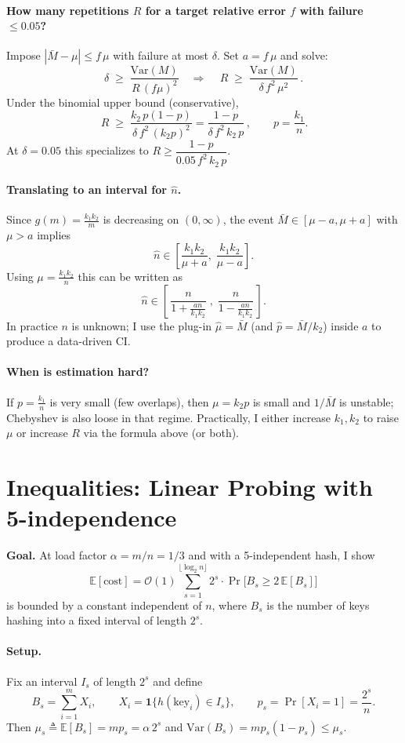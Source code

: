\paragraph{How many repetitions $R$ for a target relative error $f$ with failure $\le 0.05$?}
Impose $|\bar M-\mu|\le f\,\mu$ with failure at most $\delta$. Set $a=f\,\mu$ and solve:
\[
\delta\;\ge\; \frac{\mathrm{Var}(M)}{R\,(f\mu)^2}
\quad\Longrightarrow\quad
\boxed{\,R\;\ge\;\frac{\mathrm{Var}(M)}{\delta\,f^2\,\mu^2}\,}.
\]
Under the binomial upper bound (conservative),
\[
\boxed{\,R\;\ge\;\frac{k_2\,p(1-p)}{\delta\,f^2\,(k_2p)^2}
=\frac{1-p}{\delta\,f^2\,k_2\,p}\,,
\qquad p=\frac{k_1}{n}.}
\]
At $\delta=0.05$ this specializes to $R\ge \dfrac{1-p}{0.05\,f^2\,k_2\,p}$.

\paragraph{Translating to an interval for $\hat n$.}
Since $g(m)=\frac{k_1k_2}{m}$ is decreasing on $(0,\infty)$, the event
$\bar M\in[\mu-a,\mu+a]$ with $\mu>a$ implies
\[
\hat n \in \left[\frac{k_1k_2}{\mu+a},\;\frac{k_1k_2}{\mu-a}\right].
\]
Using $\mu=\frac{k_1k_2}{n}$ this can be written as
\[
\hat n \in \left[\,\frac{n}{1+\frac{a n}{k_1k_2}}\;,\;\frac{n}{1-\frac{a n}{k_1k_2}}\,\right].
\]
In practice $n$ is unknown; I use the plug-in $\hat \mu=\bar M$ (and $\hat p=\bar M/k_2$) inside $a$ to produce a data-driven CI.

\paragraph{When is estimation hard?}
If $p=\frac{k_1}{n}$ is very small (few overlaps), then $\mu=k_2p$ is small and $1/\bar M$ is unstable; Chebyshev is also loose in that regime. Practically, I either increase $k_1,k_2$ to raise $\mu$ or increase $R$ via the formula above (or both).
\section{Inequalities: Linear Probing with 5-independence}
\textbf{Goal.} At load factor $\alpha=m/n=1/3$ and with a 5-independent hash, I show
\[
\mathbb{E}[\text{cost}] = \mathcal{O}(1)\sum_{s=1}^{\lfloor \log_2 n \rfloor} 2^s \cdot \Pr\!\big[B_s \ge 2\,\mathbb{E}[B_s]\big]
\]
is bounded by a constant independent of $n$, where $B_s$ is the number of keys hashing into a fixed interval of length $2^s$.

\paragraph{Setup.}
Fix an interval $I_s$ of length $2^s$ and define
\[
B_s=\sum_{i=1}^m X_i,\qquad X_i=\mathbf{1}\{h(\text{key}_i)\in I_s\},\qquad
p_s=\Pr[X_i=1]=\frac{2^s}{n}.
\]
Then $\mu_s\triangleq \mathbb{E}[B_s]=m p_s=\alpha\,2^s$ and $\mathrm{Var}(B_s)=m p_s(1-p_s)\le \mu_s$.

